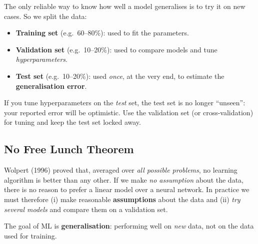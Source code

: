 The only reliable way to know how well a model generalises is to try it on new cases. So we split the data:

\begin{itemize}
  \item \textbf{Training set} (e.g.\ 60--80\%): used to fit the parameters.
  \item \textbf{Validation set} (e.g.\ 10--20\%): used to compare models and tune \emph{hyperparameters}.
  \item \textbf{Test set} (e.g.\ 10--20\%): used \emph{once}, at the very end, to estimate the \textbf{generalisation error}.
\end{itemize}

\begin{warning}
If you tune hyperparameters on the \emph{test} set, the test set is no longer ``unseen'': your reported error will be optimistic. Use the validation set (or cross-validation) for tuning and keep the test set locked away.
\end{warning}

\subsection{No Free Lunch Theorem}

Wolpert (1996) proved that, averaged over \emph{all possible problems}, no learning algorithm is better than any other. If we make \emph{no assumption} about the data, there is no reason to prefer a linear model over a neural network. In practice we must therefore (i) make reasonable \textbf{assumptions} about the data and (ii) \emph{try several models} and compare them on a validation set.

\begin{keyidea}
The goal of ML is \textbf{generalisation}: performing well on \emph{new} data, not on the data used for training.
\end{keyidea}


